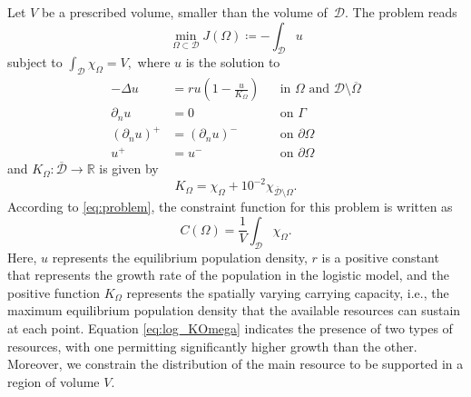 \documentclass[preprint,9pt]{elsarticle}
\begin{document}
Let $V$ be a prescribed volume, smaller than the volume of~$\mathcal{D}$.
The problem reads
\begin{equation}\label{eq:log_cost}
	\min_{\Omega \subset \mathcal{D}}
	J(\Omega) \coloneqq -\int_{\mathcal{D}} u
\end{equation}
subject to
$\int_{\mathcal{D}} \chi_{\Omega} = V,$
where $u$ is the solution to
\begin{equation}\label{eq:log_prob}
\begin{aligned}
	-\Delta u &= r u \left(1-\frac{u}{K_\Omega}\right)
	&& \text{in } \Omega \text{ and } \mathcal{D}\setminus\overline{\Omega}\\
	\partial_{n} u &= 0 && \text{on } \Gamma\\
	(\partial_n u)^+ &= (\partial_n u)^- && \text{on } \partial\Omega \\ 
				u^+ &= u^- && \text{on } \partial\Omega
\end{aligned}
\end{equation}
and $K_{\Omega}\colon\overline{\mathcal{D}}\to\mathds{R}$ is given by
\begin{equation}\label{eq:log_KOmega}
	K_\Omega=\chi_\Omega+{10}^{-2}\chi_{\overline{\mathcal{D}}\setminus\Omega}.
\end{equation}
According to \eqref{eq:problem},
the constraint function for this problem is written as
\begin{equation}\label{eq:log_const}
	C(\Omega) = \frac{1}{V} \int_{\mathcal{D}} \chi_{\Omega}.
\end{equation}
Here, $u$ represents the equilibrium population density,
$r$ is a positive constant that represents the growth rate
of the population in the logistic model,
and the positive function $K_\Omega$ represents
the spatially varying carrying capacity, i.e.,
the maximum equilibrium population density that the available
resources can sustain at each point. Equation \eqref{eq:log_KOmega}
indicates the presence of two types of resources,
with one permitting significantly higher growth than the other.
Moreover, we constrain the distribution of the main resource
to be supported in a region of volume $V$.
\end{document}
